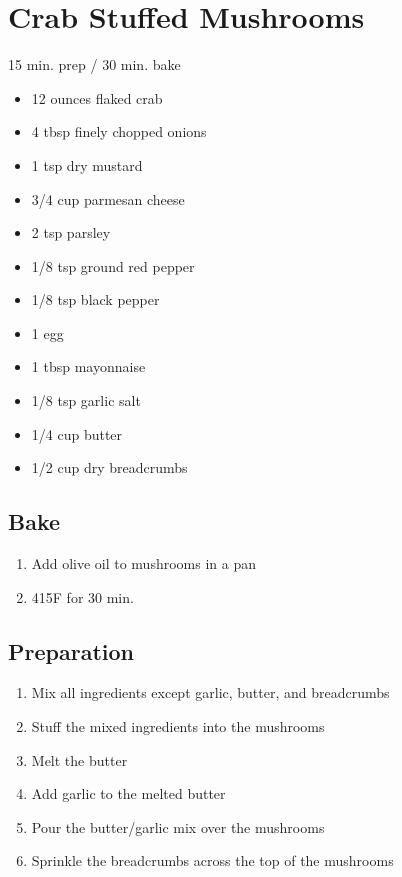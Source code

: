 \documentclass{article}
\begin{document}
\section{Crab Stuffed Mushrooms}

15 min. prep / 30 min. bake

\begin{itemize}
\item 12 ounces flaked crab
\item 4 tbsp finely chopped onions
\item 1 tsp dry mustard
\item 3/4 cup parmesan cheese
\item 2 tsp parsley
\item 1/8 tsp ground red pepper
\item 1/8 tsp black pepper
\item 1 egg
\item 1 tbsp mayonnaise
\item 1/8 tsp garlic salt
\item 1/4 cup butter
\item 1/2 cup dry breadcrumbs
\end{itemize}

\subsection{Bake}

\begin{enumerate}
\item Add olive oil to mushrooms in a pan
\item 415F for 30 min.
\end{enumerate}

\subsection{Preparation}

\begin{enumerate}
\item Mix all ingredients except garlic, butter, and breadcrumbs
\item Stuff the mixed ingredients into the mushrooms
\item Melt the butter
\item Add garlic to the melted butter
\item Pour the butter/garlic mix over the mushrooms
\item Sprinkle the breadcrumbs across the top of the mushrooms
\end{enumerate}
\end{document}
